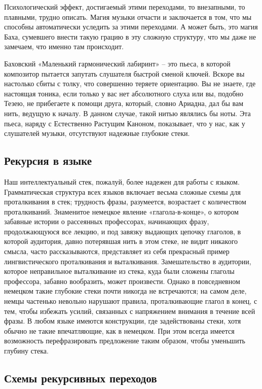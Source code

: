\documentclass[../main.tex]{subfiles}
\begin{document}
Психологический эффект, достигаемый этими переходами, то внезапными, то плавными, трудно описать. Магия музыки отчасти и заключается в том, что мы способны автоматически уследить за этими переходами. А может быть, это магия Баха, сумевшего внести такую грацию в эту сложную структуру, что мы даже не замечаем, что именно там происходит.

Баховский «Маленький гармонический лабиринт» \--- это пьеса, в которой композитор пытается запутать слушателя быстрой сменой ключей. Вскоре вы настолько сбиты с толку, что совершенно теряете ориентацию. Вы не знаете, где настоящая тоника, если только у вас нет абсолютного слуха или вы, подобно Тезею, не прибегаете к помощи друга, который, словно Ариадна, дал бы вам нить, ведущую к началу. В данном случае, такой нитью являлись бы ноты. Эта пьеса, наряду с Естественно Растущим Каноном, показывает, что у нас, как у слушателей музыки, отсутствуют надежные глубокие стеки.


\subsection{Рекурсия в языке}

Наш интеллектуальный стек, пожалуй, более надежен для работы с языком. Грамматическая структура всех языков включает весьма сложные схемы для проталкивания в стек; трудность фразы, разумеется, возрастает с количеством проталкиваний. Знаменитое немецкое явление «глагола-в-конце», о котором забавные истории о рассеянных профессорах, начинающих фразу, продолжающуюся все лекцию, и под завязку выдающих цепочку глаголов, в которой аудитория, давно потерявшая нить в этом стеке, не видит никакого смысла, часто рассказываются, представляет из себя прекрасный пример лингвистического проталкивания и выталкивания. Замешательство в аудитории, которое неправильное выталкивание из стека, куда были сложены глаголы профессора, забавно вообразить, может произвести. Однако в повседневном немецком такие глубокие стеки почти никогда не встречаются; на самом деле, немцы частенько невольно нарушают правила, проталкивающие глагол в конец, с тем, чтобы избежать усилий, связанных с напряжением внимания в течение всей фразы. В любом языке имеются конструкции, где задействованы стеки, хотя обычно не такие впечатляющие, как в немецком. При этом всегда имеется возможность перефразировать предложение таким образом, чтобы уменьшить глубину стека.


\subsection{Схемы рекурсивных переходов}
\end{document}
